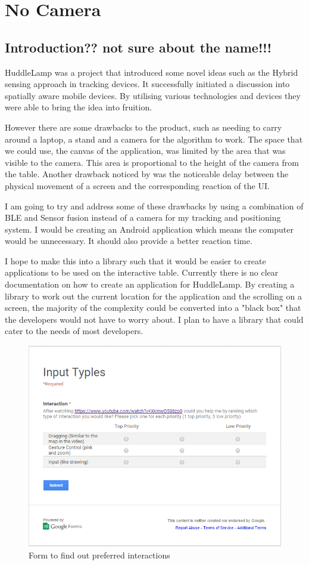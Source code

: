 \chapter{No Camera}

\label{ch:no_camera}

\section{Introduction?? not sure about the name!!!}
HuddleLamp was a project that introduced some novel ideas such as the Hybrid sensing approach in tracking devices. It successfully initiated a discussion into spatially aware mobile devices. By utilising various technologies and devices they were able to bring the idea into fruition. 

However there are some drawbacks to the product, such as needing to carry around a laptop, a stand and a camera for the algorithm to work. The space that we could use, the canvas of the application, was limited by the area that was visible to the camera. This area is proportional to the height of the camera from the table. Another drawback noticed by \citeauthor{huddlelamp-paper} was the noticeable delay between the physical movement of a screen and the corresponding reaction of the UI\cite{huddlelamp-paper}. 

I am going to try and address some of these drawbacks by using a combination of BLE and Sensor fusion instead of a camera for my tracking and positioning system. I would be creating an Android application which means the computer would be unnecessary. It should also provide a better reaction time. 

I hope to make this into a library such that it would be easier to create applications to be used on the interactive table. Currently there is no clear documentation on how to create an application for HuddleLamp. By creating a library to work out the current location for the application and the scrolling on a screen, the majority of the complexity could be converted into a "black box" that the developers would not have to worry about. I plan to have a library that could cater to the needs of most developers. 

\begin{figure}[h]
  \includegraphics[scale=0.7]{images/googleform}
  \protect\caption{Form to find out preferred interactions} 
  \label{googleform}
\end{figure}